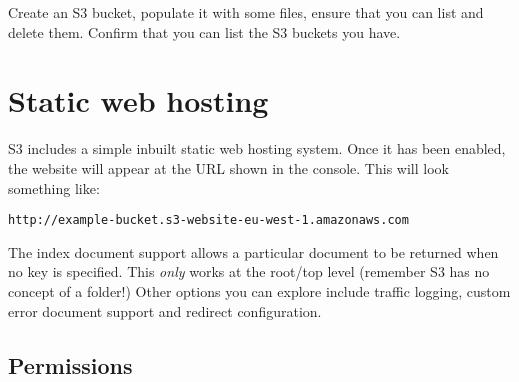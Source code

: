 \documentclass{pgnotes}
\begin{document}
Create an S3 bucket, populate it with some files, ensure that you can list and delete them.
Confirm that you can list the S3 buckets you have. 





\section{Static web hosting}

S3 includes a simple inbuilt static web hosting system.
Once it has been enabled, the website will appear at the URL shown in the console.
This will look something like: 
\begin{verbatim}
http://example-bucket.s3-website-eu-west-1.amazonaws.com
\end{verbatim}
The index document support allows a particular document to be returned when no key is specified.
This \textit{only} works at the root/top level (remember S3 has no concept of a folder!)
Other options you can explore include traffic logging, custom error document support and redirect configuration.


\subsection{Permissions}
\end{document}
